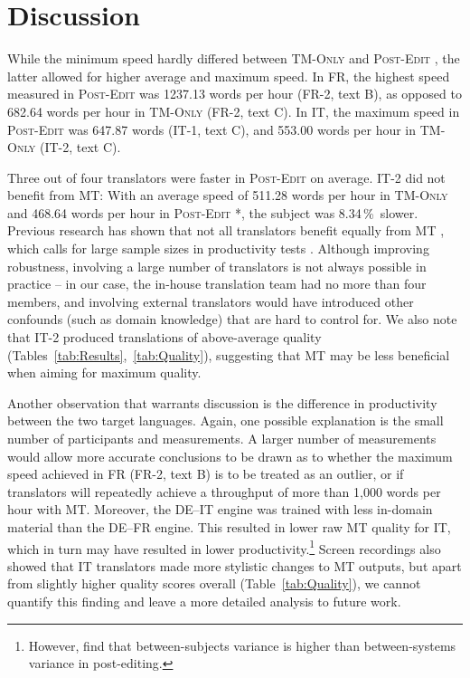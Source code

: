 \documentclass[11pt]{article}
\newcommand{\Table}[1]{Table~\ref{tab:#1}}
\newcommand{\eg}{e.\,g.,\ }
\newcommand{\percent}{\,\%\ }
\newcommand{\tm}{\textsc{TM-Only} }
\newcommand{\pe}{\textsc{Post-Edit} }
\begin{document}
\section{Discussion}
\label{sec:Discussion}

While the minimum speed hardly differed between \tm and \pe, the latter allowed for higher average and maximum speed. In FR, the highest speed measured in \pe was 1237.13 words per hour (FR-2, text B), as opposed to 682.64 words per hour in \tm (FR-2, text C). In IT, the maximum speed in \pe was 647.87 words (IT-1, text C), and 553.00 words per hour in \tm (IT-2, text C).

Three out of four translators were faster in \pe on average. IT-2 did not benefit from MT: With an average speed of 511.28 words per hour in \tm and 468.64 words per hour in \pe*, the subject was 8.34\percent slower. Previous research has shown that not all translators benefit equally from MT \citep[\eg][]{PlittMasselot2010,KoehnGermann2014}, which calls for large sample sizes in productivity tests \citep{Green2013}. Although improving robustness, involving a large number of translators is not always possible in practice -- in our case, the in-house translation team had no more than four members, and involving external translators would have introduced other confounds (such as domain knowledge) that are hard to control for. We also note that IT-2 produced translations of above-average quality (Tables~\ref{tab:Results},~\ref{tab:Quality}), suggesting that MT may be less beneficial when aiming for maximum quality.

Another observation that warrants discussion is the difference in productivity between the two target languages. Again, one possible explanation is the small number of participants and measurements. A larger number of measurements would allow more accurate conclusions to be drawn as to whether the maximum speed achieved in FR (FR-2, text B) is to be treated as an outlier, or if translators will repeatedly achieve a throughput of more than 1,000 words per hour with MT. Moreover, the DE--IT engine was trained with less in-domain material than the DE--FR engine. This resulted in lower raw MT quality for IT, which in turn may have resulted in lower productivity.\footnote{However, \citet{KoehnGermann2014} find that between-subjects variance is higher than between-systems variance in post-editing.} Screen recordings also showed that IT translators made more stylistic changes to MT outputs, but apart from slightly higher quality scores overall (\Table{Quality}), we cannot quantify this finding and leave a more detailed analysis to future work.
\end{document}
